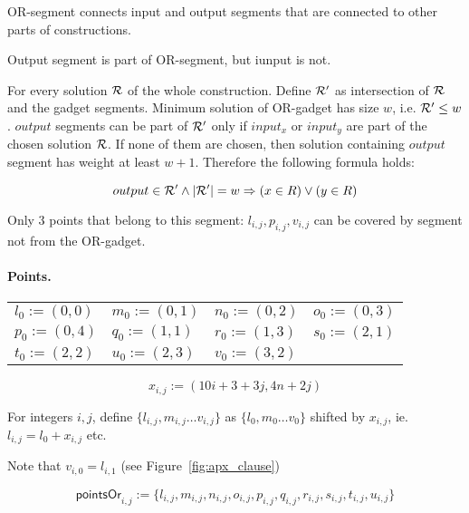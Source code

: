 OR-segment connects input and output segments
that are connected to other parts of
constructions.

Output segment is part of OR-segment, but iunput is not.

For every solution $\mathcal{R}$ of the whole construction.
Define $\mathcal{R}'$ as intersection of $\mathcal{R}$ and the gadget segments.
Minimum solution of OR-gadget has size $w$, i.e. $\mathcal{R}' \le w$.
$output$ segments can be part of $\mathcal{R}'$ only 
if $input_x$ or $input_y$ are part of the chosen solution $\mathcal{R}$.
If none of them are chosen, then solution
containing $output$ segment has weight at least $w+1$.
Therefore the following formula holds:

$$output \in \mathcal{R}' \land |\mathcal{R}'| = w \Rightarrow (x \in R) \lor (y \in R) $$

Only 3 points that belong to this segment: $l_{i,j}, p_{i,j}, v_{i,j}$
can be covered by segment not from the OR-gadget.

\paragraph{Points.}

\newcommand{\chooseOr}[3]{\mathsf{chooseOr}^{#1}_{#2,#3}}
\newcommand{\orMoveVariable}[2]{\mathsf{orMoveVariable}_{#1,#2}}
\newcommand{\pointsOr}[2]{\mathsf{pointsOr}_{#1,#2}}
\newcommand{\segmentsOr}[2]{\mathsf{segmentsOr}_{#1,#2}}



\begin{center}
	\begin{tabular}{ l l l l}
		$l_0 := (0, 0)$ &
		$m_0 := (0, 1)$ &
		$n_0 := (0, 2)$ &
		$o_0 := (0, 3)$ \\
		$p_0 := (0, 4)$ &
		$q_0 := (1, 1)$ &
		$r_0 := (1, 3)$ &
		$s_0 := (2, 1)$ \\
		$t_0 := (2, 2)$ &
		$u_0 := (2, 3)$ &
		$v_0 := (3, 2)$ &
	\end{tabular}
\end{center}


$$x_{i, j} := (10i + 3 + 3j, 4n + 2j)$$

For integers $i,j$,
define 
$\{ l_{i, j}, m_{i, j} \ldots v_{i, j} \}$
as $\{l_0, m_0 \ldots v_0\}$ shifted by $x_{i, j}$,
ie. $l_{i,j} = l_0 + x_{i,j}$ etc.

Note that $v_{i, 0} = l_{i, 1}$ (see Figure~\ref{fig:apx_clause})
 
$$\pointsOr{i}{j} := 
 \{l_{i, j}, m_{i, j}, n_{i, j}, o_{i, j},
 p_{i, j}, q_{i, j}, r_{i, j}, s_{i, j}, t_{i, j}, u_{i, j} \}
 $$
 

